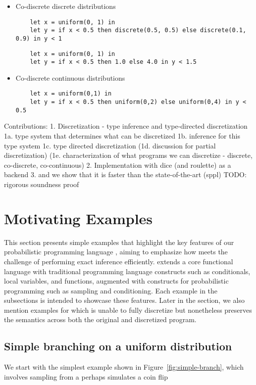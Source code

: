 \documentclass[acmsmall,screen,dvipsnames,x11names,nonacm,anonymous,review]{acmart}
\newcommand{\contdice}{\text{\scshape ContDice}\xspace}
\begin{document}
\begin{itemize}
    \item Co-discrete discrete distributions
    \begin{lstlisting}
    let x = uniform(0, 1) in
    let y = if x < 0.5 then discrete(0.5, 0.5) else discrete(0.1, 0.9) in y < 1
    \end{lstlisting}

    \begin{lstlisting}
    let x = uniform(0, 1) in
    let y = if x < 0.5 then 1.0 else 4.0 in y < 1.5
    \end{lstlisting}

    \item Co-discrete continuous distributions
    \begin{lstlisting}
    let x = uniform(0,1) in 
    let y = if x < 0.5 then uniform(0,2) else uniform(0,4) in y < 0.5
    \end{lstlisting}
\end{itemize}

Contributions:
1. Discretization - type inference and type-directed discretization
    1a. type system that determines what can be discretized
    1b. inference for this type system
    1c. type directed discretization
    (1d. discussion for partial discretization)
    (1e. characterization of what programs we can discretize - discrete, co-discrete, co-continuous)
2. Implementation with dice (and roulette) as a backend
3. and we show that it is faster than the state-of-the-art (sppl)
TODO: rigorous soundness proof

\section{Motivating Examples}
This section presents simple examples that highlight the key features of our probabilistic programming language \contdice, aiming to emphasize how \contdice meets the challenge of performing exact inference efficiently. \contdice extends a core functional language with traditional programming language constructs such as conditionals, local variables, and functions, augmented with constructs for probabilistic programming such as sampling and conditioning. Each example in the subsections is intended to showcase these features. Later in the section, we also mention examples for which \contdice is unable to fully discretize but nonetheless preserves the semantics across both the original and discretized program.

\subsection{Simple branching on a uniform distribution}
\label{sec:simple-branch}
We start with the simplest example shown in Figure~\ref{fig:simple-branch}, which involves sampling from a 
perhaps simulates a coin flip
\end{document}
